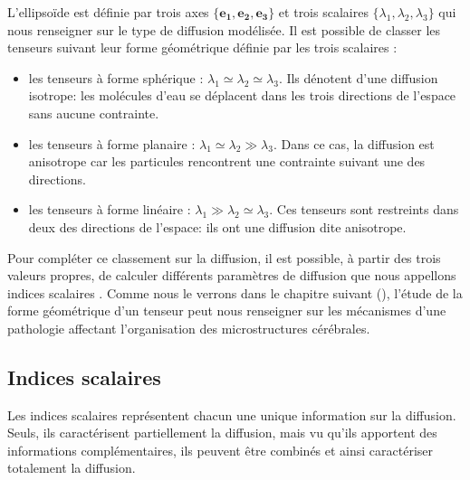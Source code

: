 L'ellipsoïde est définie par trois axes $\{\mathbf{e_1,e_2,e_3}\}$ et trois scalaires $\{\lambda_1,\lambda_2,\lambda_3\}$
qui nous renseigner sur le type de diffusion modélisée.
Il est possible de classer les tenseurs suivant leur forme géométrique définie par les trois scalaires :
\begin{itemize}
    \item les tenseurs à forme sphérique : $\lambda_1 \simeq \lambda_2 \simeq \lambda_3$.
	  Ils dénotent d'une diffusion isotrope: les molécules d'eau se déplacent dans les trois directions de l'espace sans aucune contrainte.
    \item les tenseurs à forme planaire : $\lambda_1 \simeq \lambda_2 \gg \lambda_3$.
	  Dans ce cas, la diffusion est anisotrope car les particules rencontrent une contrainte suivant une des directions.
    \item les tenseurs à forme linéaire : $\lambda_1 \gg \lambda_2 \simeq \lambda_3$.
	  Ces tenseurs sont restreints dans deux des directions de l'espace: ils ont une diffusion dite anisotrope.
\end{itemize}
Pour compléter ce classement sur la diffusion, il est possible, à partir des trois valeurs propres,
de calculer différents paramètres de diffusion que nous appellons \og indices scalaires \fg.
Comme nous le verrons dans le chapitre suivant (), l'étude de la forme géométrique d'un tenseur 
peut nous renseigner sur les mécanismes d'une pathologie affectant l'organisation des microstructures cérébrales.


\subsection{Indices scalaires}
Les indices scalaires représentent chacun une unique information sur la diffusion.
Seuls, ils caractérisent partiellement la diffusion, mais vu qu'ils apportent des informations complémentaires,
ils peuvent être combinés et ainsi caractériser totalement la diffusion.\\

